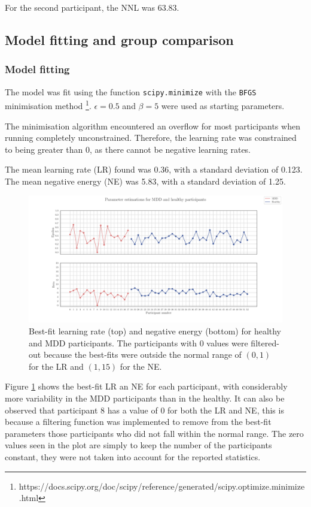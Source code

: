 \documentclass[12pt]{article}
\begin{document}
For the second participant, the NNL was 63.83.

\subsection{Model fitting and group comparison}

\subsubsection{Model fitting}
\label{sec:fit-model-0}

The model was fit using the function \texttt{scipy.minimize} with the \texttt{BFGS} minimisation method \footnote{https://docs.scipy.org/doc/scipy/reference/generated/scipy.optimize.minimize.html}. $\epsilon = 0.5$ and $\beta = 5$ were used as starting parameters.

The minimisation algorithm encountered an overflow for most participants when running completely unconstrained. Therefore, the learning rate was constrained to being greater than 0, as there cannot be negative learning rates.

The mean learning rate (LR) found was 0.36, with a standard deviation of 0.123. The mean negative energy (NE) was 5.83, with a standard deviation of 1.25. 

\begin{figure}[h!]
	\centering
	\hspace*{-0.6in}
	\includegraphics[width=1.1\linewidth]{figures/2.4.pdf}
	\caption{Best-fit learning rate (top) and negative energy (bottom) for healthy and MDD participants. The participants with 0 values were filtered-out because the best-fits were outside the normal range of $(0,1)$ for the LR and $(1, 15)$ for the NE.}
	\label{fig:2.4}
\end{figure}

Figure \ref{fig:2.4} shows the best-fit LR an NE for each participant, with considerably more variability in the MDD participants than in the healthy. It can also be observed that participant 8 has a value of 0 for both the LR and NE, this is because a filtering function was implemented to remove from the best-fit parameters those participants who did not fall within the normal range. The zero values seen in the plot are simply to keep the number of the participants constant, they were not taken into account for the reported statistics. 
\end{document}
